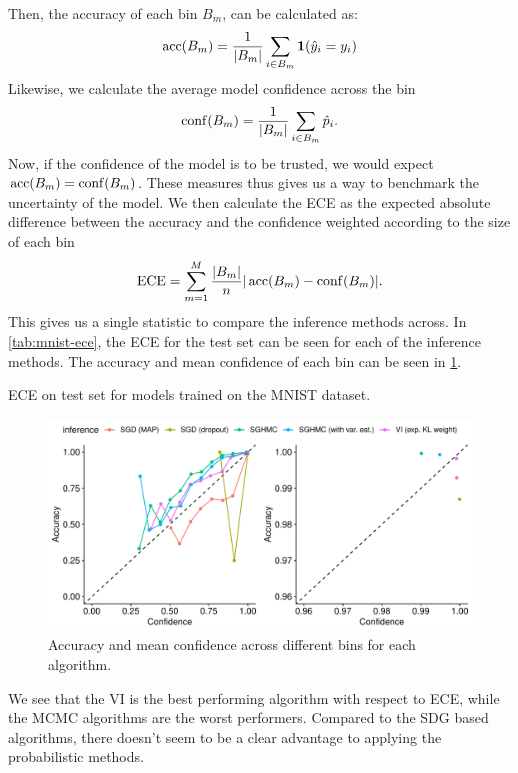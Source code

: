Then, the accuracy of each bin $B_m$, can be calculated as:
\begin{align}
    \operatorname{acc}(B_m) = \frac{1}{|B_m|}\sum_{i\in B_m}\bm{1}(\hat{y}_i = y_i)
\end{align}
Likewise, we calculate the average model confidence across the bin
\begin{align}
    \operatorname{conf}(B_m) = \frac{1}{|B_m|}\sum_{i\in B_m} \hat{p}_i.
\end{align}
Now, if the confidence of the model is to be trusted, we would expect $\operatorname{acc}(B_m) = \operatorname{conf}(B_m)$.
These measures thus gives us a way to benchmark the uncertainty of the model.
We then calculate the ECE as the expected absolute difference between the accuracy and the confidence weighted according to the size of each bin
\begin{align}
    \text{ECE} = \sum_{m=1}^{M} \frac{|B_m|}{n}|\operatorname{acc}(B_m)-\operatorname{conf}(B_m)|.
\end{align}
This gives us a single statistic to compare the inference methods across.
In \cref{tab:mnist-ece}, the ECE for the test set can be seen for each of the inference methods.
The accuracy and mean confidence of each bin can be seen in \cref{fig:mnist-calibration}. 
\begin{table}[htbp]
    \centering
    
    \caption{ECE on test set for models trained on the MNIST dataset.}
    \label{tab:mnist-ece}
\end{table}
\begin{figure}[htbp]
    \centering
    \includegraphics[width=\linewidth]{Figures/mnist-calibration.pdf}
    \caption{Accuracy and mean confidence across different bins for each algorithm.}
    \label{fig:mnist-calibration}
\end{figure}
We see that the VI is the best performing algorithm with respect to ECE, while the MCMC algorithms are the worst performers. 
Compared to the SDG based algorithms, there doesn't seem to be a clear advantage to applying the probabilistic methods.

